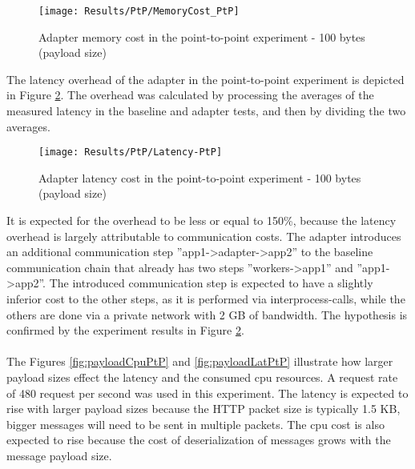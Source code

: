 \begin{figure}[htbp]
    \centering
    \texttt{[image: Results/PtP/MemoryCost\_PtP]}
    \caption{Adapter memory cost in the point-to-point experiment - 100 bytes (payload size)}
    \label{fig:memCostPtp}
\end{figure}

\newpage

The latency overhead of the adapter in the point-to-point experiment is depicted in Figure \ref{fig:latPtP}.
The overhead was calculated by processing the averages of the measured latency in the baseline and adapter tests, and then by dividing the two averages.

\begin{figure}[htbp]
    \centering
    \texttt{[image: Results/PtP/Latency-PtP]}
    \caption{Adapter latency cost in the point-to-point experiment - 100 bytes (payload size)}
    \label{fig:latPtP}
\end{figure}

It is expected for the overhead to be less or equal to 150\%, because the latency overhead is largely attributable to communication costs.
The adapter introduces an additional communication step ''app1->adapter->app2'' to the baseline communication chain that already has two steps ''workers->app1'' and ''app1->app2''.
The introduced communication step is expected to have a slightly inferior cost to the other steps, as it is performed via interprocess-calls, while the others are done via a private network with 2 GB of bandwidth.
The hypothesis is confirmed by the experiment results in Figure \ref{fig:latPtP}.

\paragraph{}

The Figures  \ref{fig:payloadCpuPtP} and \ref{fig:payloadLatPtP} illustrate how larger payload sizes effect the latency and the consumed cpu resources.
A request rate of 480 request per second was used in this experiment.
The latency is expected to rise with larger payload sizes because the HTTP packet size is typically 1.5 KB, bigger messages will need to be sent in multiple packets.
The cpu cost is also expected to rise because the cost of deserialization of messages grows with the message payload size.

\paragraph{}

